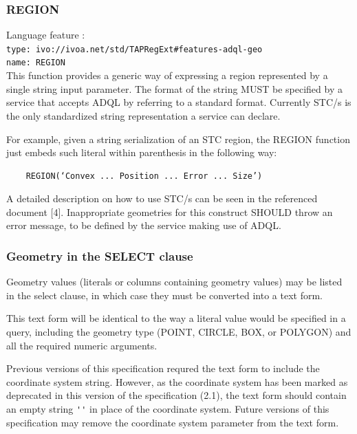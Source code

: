 \documentclass[11pt,a4paper]{ivoa}
\begin{document}
\subsubsection{REGION}
\label{sec:geom.functions.region}
{\footnotesize Language feature :}\\
{\footnotesize \verb|type: ivo://ivoa.net/std/TAPRegExt#features-adql-geo|}\\
{\footnotesize \verb|name: REGION|}\\

This function provides a generic way of expressing a region represented by
a single string input parameter. The format of the string MUST be specified
by a service that accepts ADQL by referring to a standard format. Currently
STC/s is the only standardized string representation a service can declare.

For example, given a string serialization of an STC region, the REGION
function just embeds such literal within parenthesis in the following way:

\begin{verbatim}
    REGION(‘Convex ... Position ... Error ... Size’)
\end{verbatim}

A detailed description on how to use STC/s can be seen in the referenced
document [4]. Inappropriate geometries for this construct SHOULD throw an
error message, to be defined by the service making use of ADQL.

\subsubsection{Geometry in the SELECT clause}
\label{sec:geom.select}

Geometry values (literals or columns containing geometry values) may be
listed in the select clause, in which case they must be converted into a
text form.

This text form will be identical to the way a literal value would be
specified in a query, including the geometry type (POINT, CIRCLE, BOX,
or POLYGON) and all the required numeric arguments.

Previous versions of this specification requred the text form to include the
coordinate system string. However, as the coordinate system has been marked
as deprecated in this version of the specification (2.1), the text form
should contain an empty string \verb:'': in place of the coordinate
system. Future versions of this specification may remove the coordinate
system parameter from the text form.
\end{document}
